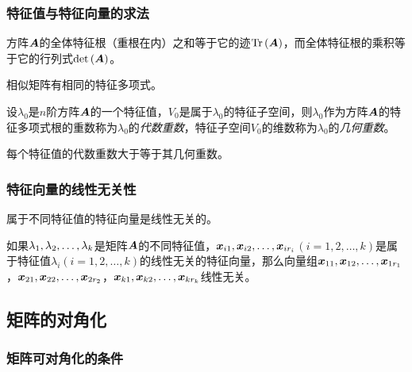 \documentclass{ctexart}
\begin{document}
\subsubsection*{特征值与特征向量的求法}

\begin{theorem}
    方阵\(\boldsymbol{A}\)的全体特征根（重根在内）之和等于它的迹\(\mathrm{Tr}\left( \boldsymbol{A} \right)\)，而全体特征根的乘积等于它的行列式\(\mathrm{det}\left( \boldsymbol{A} \right)\)。
\end{theorem}

\begin{theorem}
    相似矩阵有相同的特征多项式。
\end{theorem}

\begin{definition}[代数重数与几何重数]
    设\(\lambda_0\)是\(n\)阶方阵\(\boldsymbol{A}\)的一个特征值，\(V_0\)是属于\(\lambda_0\)的特征子空间，则\(\lambda_0\)作为方阵\(\boldsymbol{A}\)的特征多项式根的重数称为\(\lambda_0\)的\emph{代数重数}，特征子空间\(V_0\)的维数称为\(\lambda_0\)的\emph{几何重数}。
\end{definition}

\begin{theorem}
    每个特征值的代数重数大于等于其几何重数。
\end{theorem}

\subsubsection*{特征向量的线性无关性}

\begin{theorem}
    属于不同特征值的特征向量是线性无关的。
\end{theorem}

\begin{theorem}
    如果\({\lambda}_1,{\lambda}_2,\dots,{\lambda}_{k}\)是矩阵\(\boldsymbol{A}\)的不同特征值，\(\boldsymbol{x}_{i1},\boldsymbol{x}_{i2},\dots,\boldsymbol{x}_{ir_i}\)\((i=1,2,\dots,k)\)是属于特征值\(\lambda_i(i=1,2,\dots,k)\)的线性无关的特征向量，那么向量组\(\boldsymbol{x}_{11},\boldsymbol{x}_{12},\dots,\boldsymbol{x}_{1r_1}\)，\(\boldsymbol{x}_{21},\boldsymbol{x}_{22},\dots,\boldsymbol{x}_{2r_2}\)，\(\boldsymbol{x}_{k1},\boldsymbol{x}_{k2},\dots,\boldsymbol{x}_{kr_k}\)线性无关。
\end{theorem}

\subsection{矩阵的对角化}

\subsubsection*{矩阵可对角化的条件}
\end{document}
